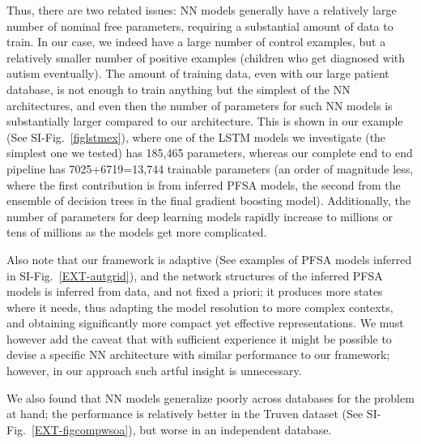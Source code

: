 \documentclass[onecolumn,,10pt]{IEEEtran}
\newif\ifFIGS
\begin{document}
  {\HCOL
  Thus, there are two related issues:  NN models generally have a relatively large number of nominal free parameters, requiring a  substantial amount of data to train. In our case, we indeed have a large number of control examples, but a relatively smaller number of positive examples (children who get diagnosed with autism eventually). The amount of training data, even with our large patient database, is not enough to train anything but the simplest of the NN architectures, and even then the number of parameters for such NN models is substantially larger compared to our architecture. This is shown in our example (See SI-Fig.~\ref{figlstmex}), where one of the LSTM models we investigate (the simplest one we tested) has 185,465 parameters, whereas our complete end to end pipeline has 7025+6719=13,744 trainable parameters (an order of magnitude less, where the first contribution is from inferred PFSA models, the second from the ensemble of decision trees in the final gradient boosting model). Additionally, the number of parameters for deep learning models rapidly increase to millions or tens of millions as the models get more complicated.

 Also note that our framework is adaptive (See examples of PFSA models inferred in SI-Fig.~\ref{EXT-autgrid}), and the network structures of the inferred PFSA models is inferred from data, and not fixed a priori; it produces more states where it needs, thus adapting the model resolution to more complex contexts, and obtaining significantly more compact yet effective representations. We must however add the caveat that with sufficient  experience it might be possible to devise a specific NN architecture with similar performance to our framework; however, in our approach such artful insight is unnecessary. 

We also found  that NN models generalize poorly across databases for the problem at hand; the performance is relatively better in the Truven dataset (See SI-Fig.~\ref{EXT-figcompwsoa}), but worse in an independent database.
}
\ifFIGS
\end{document}
